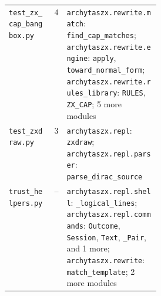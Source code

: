 \begin{xltabular}{\linewidth}{@{}>{\raggedright\arraybackslash}p{0.3\linewidth}r>{\raggedright\arraybackslash}X@{}}
\texttt{test\_\allowbreak{}zx\_\allowbreak{}cap\_\allowbreak{}bangbox.py} & 4 & \texttt{archytaszx.\allowbreak{}rewrite.\allowbreak{}match}: \texttt{find\_\allowbreak{}cap\_\allowbreak{}matches}; \texttt{archytaszx.\allowbreak{}rewrite.\allowbreak{}engine}: \texttt{apply}, \texttt{toward\_\allowbreak{}normal\_\allowbreak{}form}; \texttt{archytaszx.\allowbreak{}rewrite.\allowbreak{}rules\_\allowbreak{}library}: \texttt{RULES}, \texttt{ZX\_\allowbreak{}CAP}; 5 more modules \\
\texttt{test\_\allowbreak{}zxdraw.py} & 3 & \texttt{archytaszx.\allowbreak{}repl}: \texttt{zxdraw}; \texttt{archytaszx.\allowbreak{}repl.\allowbreak{}parser}: \texttt{parse\_\allowbreak{}dirac\_\allowbreak{}source} \\
\texttt{trust\_\allowbreak{}helpers.py} & -- & \texttt{archytaszx.\allowbreak{}repl.\allowbreak{}shell}: \texttt{\_\allowbreak{}logical\_\allowbreak{}lines}; \texttt{archytaszx.\allowbreak{}repl.\allowbreak{}commands}: \texttt{Outcome}, \texttt{Session}, \texttt{Text}, \texttt{\_\allowbreak{}Pair}, and 1 more; \texttt{archytaszx.\allowbreak{}rewrite}: \texttt{match\_\allowbreak{}template}; 2 more modules \\
\end{xltabular}
